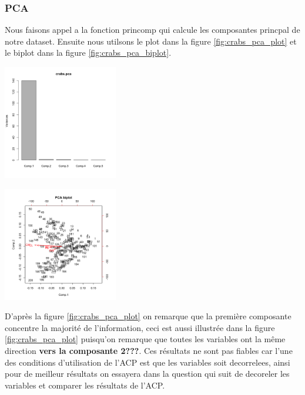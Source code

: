 \documentclass[10pt]{article}
\begin{document}
\subsubsection{PCA}
Nous faisons appel a la fonction princomp qui calcule les composantes princpal de notre dataset. Ensuite nous utilsons le plot dans la figure \ref{fig:crabs_pca_plot} et le biplot dans la figure \ref{fig:crabs_pca_biplot}.\\
	\begin{minipage}{.5\textwidth}
		\centering
		\includegraphics[width=50mm]{Figures/Crabs/pca_plot.png}
		\label{fig:crabs_pca_plot}
	\end{minipage}%
	\hspace{0.08\linewidth}
	\begin{minipage}{.5\textwidth}
		\centering
		\includegraphics[width=50mm]{Figures/Crabs/pca_biplot.png}
		\label{fig:crabs_pca_biplot}
	\end{minipage}
D'après la figure \ref{fig:crabs_pca_plot} on remarque que la première composante concentre la majorité de l'information, ceci est aussi illustrée dans la figure \ref{fig:crabs_pca_plot} puisqu'on remarque que toutes les variables ont la même direction \textbf{vers la composante 2???}. Ces résultats ne sont pas fiables car l'une des conditions d'utilisation de l'ACP est que les variables soit decorrelees, ainsi pour de meilleur résultats on essayera dans la question qui suit de decoreler les variables et comparer les résultats de l'ACP.
\end{document}
